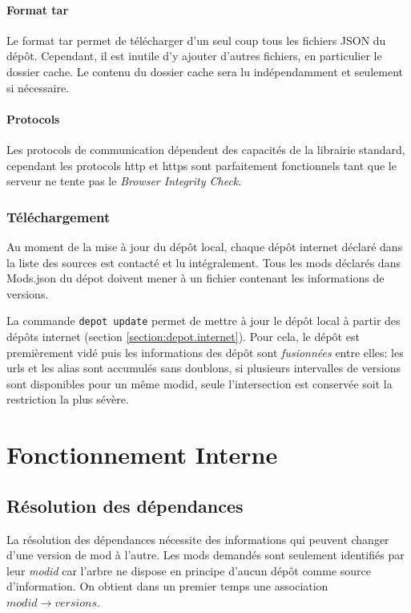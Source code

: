 \documentclass{article}
\begin{document}
\paragraph{Format tar}
Le format tar permet de télécharger d'un seul coup tous les fichiers JSON du dépôt.
Cependant, il est inutile d'y ajouter d'autres fichiers, en particulier le dossier cache.
Le contenu du dossier cache sera lu indépendamment et seulement si nécessaire.

\paragraph{Protocols}
Les protocols de communication dépendent des capacités de la librairie standard, cependant les protocols http et https sont parfaitement fonctionnels tant que le serveur ne tente pas le \textit{Browser Integrity Check}.

\subsubsection{Téléchargement}
Au moment de la mise à jour du dépôt local, chaque dépôt internet déclaré dans la liste des sources est contacté et lu intégralement.
Tous les mods déclarés dans \textsf{Mods.json} du dépot doivent mener à un fichier contenant les informations de versions.

La commande \texttt{depot update} permet de mettre à jour le dépôt local à partir des dépôts internet (section \ref{section:depot.internet}).
Pour cela, le dépôt est premièrement vidé puis les informations des dépôt sont \textit{fusionnées} entre elles: les urls et les alias sont accumulés sans doublons, si plusieurs intervalles de versions sont disponibles pour un même modid, seule l'intersection est conservée soit la restriction la plus sévère.

%
%
\section{Fonctionnement Interne}
\subsection{Résolution des dépendances}
La résolution des dépendances nécessite des informations qui peuvent changer d'une version de mod à l'autre.
Les mods demandés sont seulement identifiés par leur \textit{modid} car l'arbre ne dispose en principe d'aucun dépôt comme source d'information.
On obtient dans un premier temps une association $modid \rightarrow versions$.
\end{document}
